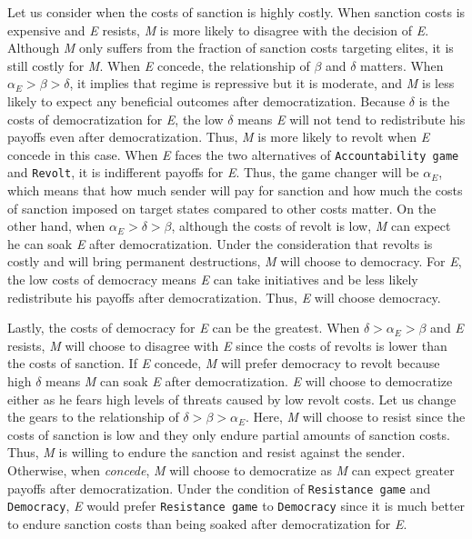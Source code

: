 \documentclass[11pt, letterpage]{article}
\begin{document}
Let us consider when the costs of sanction is highly costly. When sanction costs is expensive and \textit{E} resists, \textit{M} is more likely to disagree with the decision of \textit{E}. Although \textit{M} only suffers from the fraction of sanction costs targeting elites, it is still costly for \textit{M}. When \textit{E} concede, the relationship of $\beta$ and $\delta$ matters. When $\alpha_{E} > \beta > \delta$, it implies that regime is repressive but it is moderate, and \textit{M} is less likely to expect any beneficial outcomes after democratization. Because $\delta$ is the costs of democratization for \textit{E}, the low $\delta$ means \textit{E} will not tend to redistribute his payoffs even after democratization. Thus, \textit{M} is more likely to revolt when \textit{E} concede in this case. When \textit{E} faces the two alternatives of \texttt{Accountability game} and \texttt{Revolt}, it is indifferent payoffs for \textit{E}. Thus, the game changer will be $\alpha_{E}$, which means that how much sender will pay for sanction and how much the costs of sanction imposed on target states compared to other costs matter. On the other hand, when $\alpha_{E} > \delta > \beta$, although the costs of revolt is low, \textit{M} can expect he can soak \textit{E} after democratization. Under the consideration that revolts is costly and will bring permanent destructions, \textit{M} will choose to democracy. For \textit{E}, the low costs of democracy means \textit{E} can take initiatives and be less likely redistribute his payoffs after democratization. Thus, \textit{E} will choose democracy.

Lastly, the costs of democracy for \textit{E} can be the greatest. When $\delta > \alpha_{E} > \beta$ and \textit{E} resists, \textit{M} will choose to disagree with \textit{E} since the costs of revolts is lower than the costs of sanction. If \textit{E} concede, \textit{M} will prefer democracy to revolt because high $\delta$ means \textit{M} can soak \textit{E} after democratization. \textit{E} will choose to democratize either as he fears high levels of threats caused by low revolt costs. Let us change the gears to the relationship of $\delta > \beta > \alpha_{E}$. Here, \textit{M} will choose to resist since the costs of sanction is low and they only endure partial amounts of sanction costs. Thus, \textit{M} is willing to endure the sanction and resist against the sender. Otherwise, when \textit{concede}, \textit{M} will choose to democratize as \textit{M} can expect greater payoffs after democratization. Under the condition of \texttt{Resistance game} and \texttt{Democracy}, \textit{E} would prefer \texttt{Resistance game} to \texttt{Democracy} since it is much better to endure sanction costs than being soaked after democratization for \textit{E}.
\end{document}
